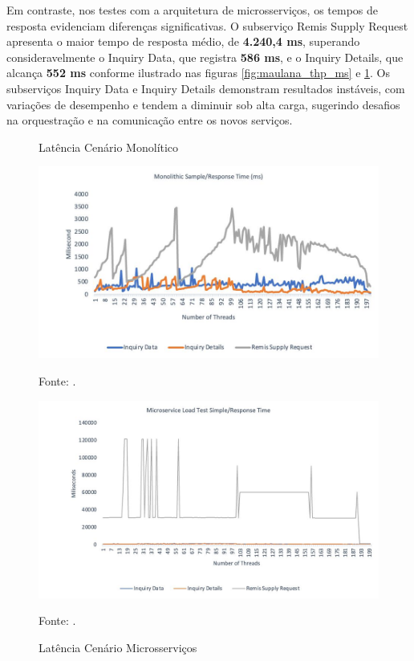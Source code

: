 Em contraste, nos testes com a arquitetura de microsserviços, os tempos de resposta evidenciam diferenças significativas. O subserviço Remis Supply Request apresenta o maior tempo de resposta médio, de \textbf{4.240,4 ms}, superando consideravelmente o Inquiry Data, que registra \textbf{586 ms}, e o Inquiry Details, que alcança \textbf{552 ms} conforme ilustrado nas figuras \ref{fig:maulana_thp_ms} e \ref{fig:maulana_time_ms}. Os subserviços Inquiry Data e Inquiry Details demonstram resultados instáveis, com variações de desempenho e tendem a diminuir sob alta carga, sugerindo desafios na orquestração e na comunicação entre os novos serviços.

\begin{figure}[htb]
  \centering
  \begin{minipage}[t]{0.48\linewidth}
    \caption{Latência Cenário Monolítico}
    \label{fig:maulana_time_mono}
    \centering
    \includegraphics[width=\linewidth]{imagens/maulana_time_mono.jpg}    
    {\par \raggedright \footnotesize Fonte: \textcite{maulana_design_2022}.\par}
  \end{minipage}%
  \hfill
  \begin{minipage}[t]{0.48\linewidth}
    \caption{Latência Cenário Microsserviços}
    \label{fig:maulana_time_ms}
    \centering
    \includegraphics[width=\linewidth]{imagens/maulana_time_ms.jpg}    
    {\par \raggedright \footnotesize Fonte: \textcite{maulana_design_2022}.\par}
  \end{minipage}
\end{figure}

